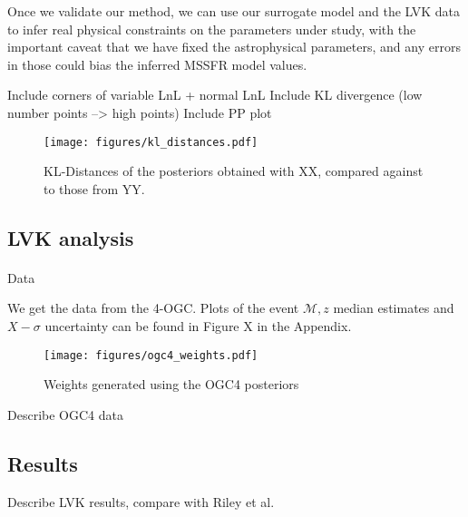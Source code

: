 \documentclass[twocolumn]{aastex631}
\newcommand{\Mc}{\ensuremath{\mathcal{M}}\xspace}
\newcommand{\project}[1]{\textsf{#1}}
\newcommand{\ogc}{\project{4-OGC}}
\begin{document}
Once we validate our method, we can use our surrogate model and the LVK data to infer real physical constraints on the parameters under study, with the important caveat that we have fixed the astrophysical parameters, and any errors in those could bias the inferred \ac{MSSFR} model values.

Include corners of variable LnL + normal LnL
Include KL divergence (low number points --> high points)
Include PP plot





\begin{figure}[ht!]
    \begin{centering}
        \texttt{[image: figures/kl\_distances.pdf]}
        \caption{
            KL-Distances of the posteriors obtained with XX, compared against to those from YY.
        }
        \label{fig:kl_distances}
    \end{centering}
\end{figure}




\subsection{LVK analysis}
\paragraph{}{Data}

We get the data from the \ogc.
Plots of the event $\Mc,z$ median estimates and $X-\sigma$ uncertainty can be found in Figure X in the Appendix.




\begin{figure}[ht!]
    \begin{centering}
        \texttt{[image: figures/ogc4\_weights.pdf]}
        \caption{
            Weights generated using the OGC4 posteriors
        }
        \label{fig:ogc4_weights}
    \end{centering}
\end{figure}

Describe OGC4 data

\subsection{Results}
Describe LVK results, compare with Riley et al.
\end{document}
